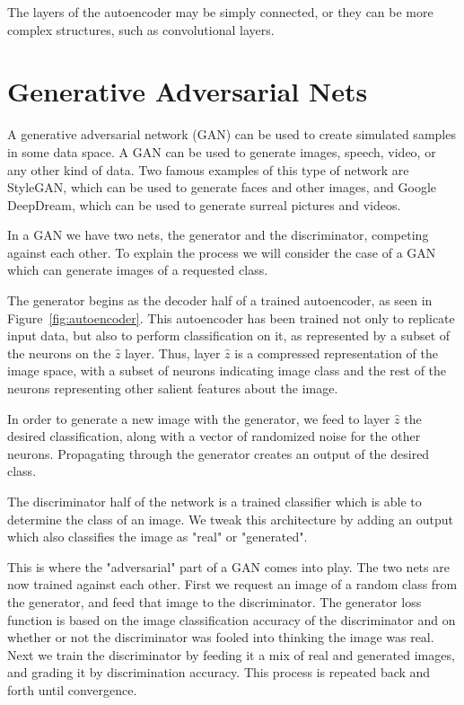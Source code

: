 The layers of the autoencoder may be simply connected, or they can be more complex structures, such as convolutional layers.

\section{Generative Adversarial Nets}

A generative adversarial network (GAN) can be used to create simulated samples in some data space. A GAN can be used to generate images, speech, video, or any other kind of data. Two famous examples of this type of network are StyleGAN, which can be used to generate faces and other images, and Google DeepDream, which can be used to generate surreal pictures and videos.

In a GAN we have two nets, the generator and the discriminator, competing against each other. To explain the process we will consider the case of a GAN which can generate images of a requested class.

The generator begins as the decoder half of a trained autoencoder, as seen in Figure~\ref{fig:autoencoder}. This autoencoder has been trained not only to replicate input data, but also to perform classification on it, as represented by a subset of the neurons on the $\hat{z}$ layer. Thus, layer $\hat{z}$ is a compressed representation of the image space, with a subset of neurons indicating image class and the rest of the neurons representing other salient features about the image.

In order to generate a new image with the generator, we feed to layer $\hat{z}$ the desired classification, along with a vector of randomized noise for the other neurons. Propagating through the generator creates an output of the desired class.

The discriminator half of the network is a trained classifier which is able to determine the class of an image. We tweak this architecture by adding an output which also classifies the image as "real" or "generated".

This is where the "adversarial" part of a GAN comes into play. The two nets are now trained against each other. First we request an image of a random class from the generator, and feed that image to the discriminator. The generator loss function is based on the image classification accuracy of the discriminator and on whether or not the discriminator was fooled into thinking the image was real. Next we train the discriminator by feeding it a mix of real and generated images, and grading it by discrimination accuracy. This process is repeated back and forth until convergence.

